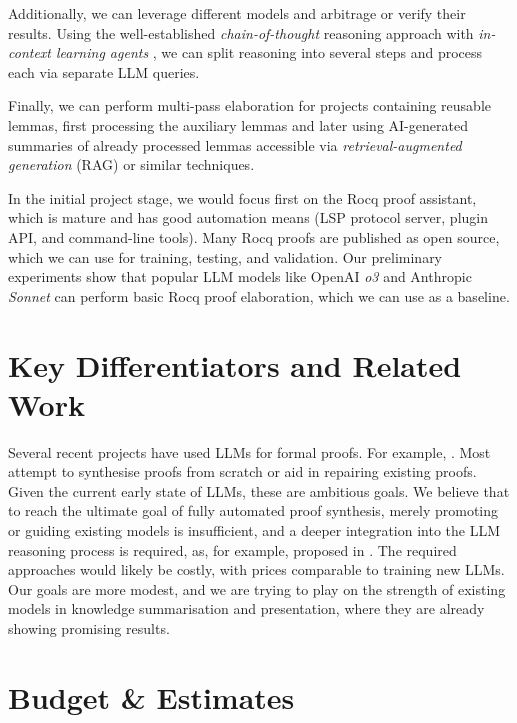 \documentclass[10pt,nonacm,natbib=false]{acmart}
\begin{document}
Additionally, we can leverage different models and arbitrage or verify
their results. Using the well-established \textit{chain-of-thought}
reasoning approach with \textit{in-context learning agents}
\cite{wei2022chain}, we can split reasoning into several steps and
process each via separate LLM queries.

Finally, we can perform multi-pass elaboration for projects containing
reusable lemmas, first processing the auxiliary lemmas and later using
AI-generated summaries of already processed lemmas accessible via
\textit{retrieval-augmented generation} (RAG) or similar techniques.

In the initial project stage, we would focus first on the Rocq proof
assistant, which is mature and has good automation means (LSP protocol
server, plugin API, and command-line tools). Many Rocq proofs are
published as open source, which we can use for training, testing, and
validation. Our preliminary experiments show that popular LLM models
like OpenAI \textit{o3} and Anthropic \textit{Sonnet} can perform basic Rocq
proof elaboration, which we can use as a baseline.

\section*{Key Differentiators and Related Work}

Several recent projects have used LLMs for formal proofs. For example,
\cite{DBLP:conf/kbse/LuD024, DBLP:journals/corr/abs-2410-14835, thakur2024incontextlearningagentformal, DBLP:conf/icml/YangD19,
  DBLP:conf/kbse/KozyrevSKP24, DBLP:conf/nips/YangSGCSYGPA23,
  DBLP:conf/emnlp/WangZJPDPZ24}. Most attempt to synthesise proofs
from scratch or aid in repairing existing proofs. Given the current
early state of LLMs, these are ambitious goals. We believe that to
reach the ultimate goal of fully automated proof synthesis, merely
promoting or guiding existing models is insufficient, and a deeper
integration into the LLM reasoning process is required, as, for
example, proposed in \cite{park2024grammaraligneddecoding}. The
required approaches would likely be costly, with prices comparable to
training new LLMs. Our goals are more modest, and we are trying to
play on the strength of existing models in knowledge summarisation and
presentation, where they are already showing promising results.

\section*{Budget \& Estimates}
\end{document}
